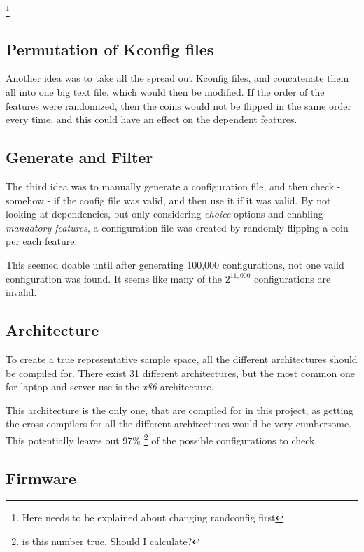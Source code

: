 \documentclass[a4paper,11pt]{report}
\begin{document}
    \footnote{Here needs to be explained about changing randconfig first}

    \subsection*{Permutation of Kconfig files}
Another idea was to take all the spread out Kconfig files, and concatenate 
them all into one big text file, which would then be modified. If the order of 
the features were randomized, then the coins would not be flipped in the same 
order every time, and this could have an effect on the dependent features. \\

    \subsection*{Generate and Filter}
The third idea was to manually generate a configuration file, and then check - 
somehow - if the config file was valid, and then use it if it was valid. By 
not looking at dependencies, but only considering \emph{choice} options and 
enabling \emph{mandatory features}, a configuration file was created by 
randomly flipping a coin per each feature.

This seemed doable until after generating 100,000 configurations, not one 
valid configuration was found. It seems like many of the $2^{11,000}$ 
configurations are invalid.

\subsection{Architecture}

To create a true representative sample space, all the different architectures 
should be compiled for. There exist 31 different architectures, but the most 
common one for laptop and server use is the \emph{x86} architecture.

This architecture is the only one, that are compiled for in this project, as 
getting the cross compilers for all the different architectures would be very 
cumbersome. 
\\


This potentially leaves out 97\% \footnote{is this number true. Should I 
calculate?} of the possible configurations to check.

\subsection{Firmware}
\end{document}
